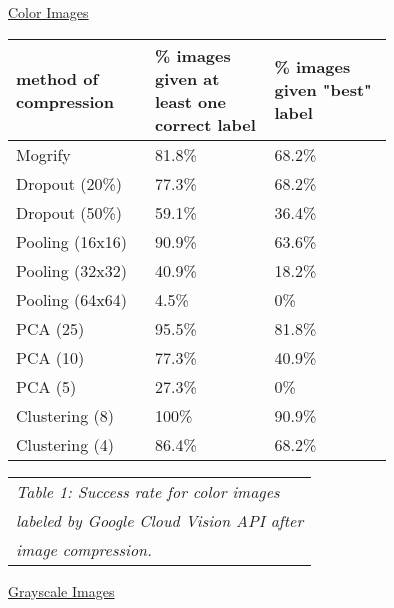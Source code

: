 \documentclass[letterpaper, 12 pt, conference]{ieeeconf}  %
\begin{document}
\hspace*{28mm} \underline{Color Images}

\vspace*{2mm}

\bgroup
\def\arraystretch{1.2} %
\begin{tabular}{|p{0.25\linewidth}|p{0.25\linewidth}|p{0.25\linewidth}|}
\hline
{\bf method of compression} & {\bf \% images given at least one correct label}
	& {\bf \% images given "best" label} \\
\hline
Mogrify & 81.8\% & 68.2\% \\ %
\hline
Dropout (20\%) & 77.3\% & 68.2\% \\ %
\hline
Dropout (50\%) & 59.1\% & 36.4\% \\ %
\hline
Pooling (16x16) & 90.9\% & 63.6\% \\ %
\hline
Pooling (32x32) & 40.9\% & 18.2\% \\ %
\hline
Pooling (64x64) & 4.5\% & 0\% \\ %
\hline
PCA (25) & 95.5\% & 81.8\% \\ %
\hline
PCA (10) & 77.3\% & 40.9\% \\ %
\hline
PCA (5) & 27.3\% & 0\% \\ %
\hline
Clustering (8) & 100\% & 90.9\% \\ %
\hline
Clustering (4) & 86.4\% & 68.2\% \\ %
\hline
\end{tabular}
\egroup

\vspace*{2mm}
\begin{tabular}{l}
{\it Table 1: Success rate for color images} \\
{\it labeled by Google Cloud Vision API after} \\
{\it image compression.} \\
\end{tabular}
\vspace*{4mm}

\vspace*{2mm}

\hspace*{28mm} \underline{Grayscale Images}

\vspace*{2mm}
\end{document}
